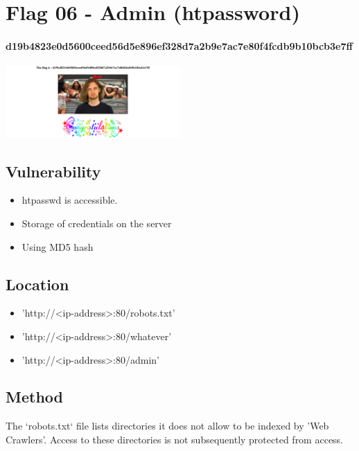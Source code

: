 \section{Flag 06 - Admin (htpassword)}

\paragraph{d19b4823e0d5600ceed56d5e896ef328d7a2b9e7ac7e80f4fcdb9b10bcb3e7ff}
\begin{center}
    \includegraphics[width=0.5\textwidth]{09.Flag06/06-06.png}\\[0cm] 
\end{center}

\subsection{Vulnerability}

\begin{itemize}
    \item htpasswd is accessible.
    \item Storage of credentials on the server
    \item Using MD5 hash    
\end{itemize}

\subsection{Location}

\begin{itemize}
    \item 'http://<ip-address>:80/robots.txt'
    \item 'http://<ip-address>:80/whatever'
    \item 'http://<ip-address>:80/admin'
\end{itemize}

\subsection{Method}

The `robots.txt` file lists directories it does not allow to be indexed by 'Web Crawlers'. Access to these directories is not subsequently protected from access.

